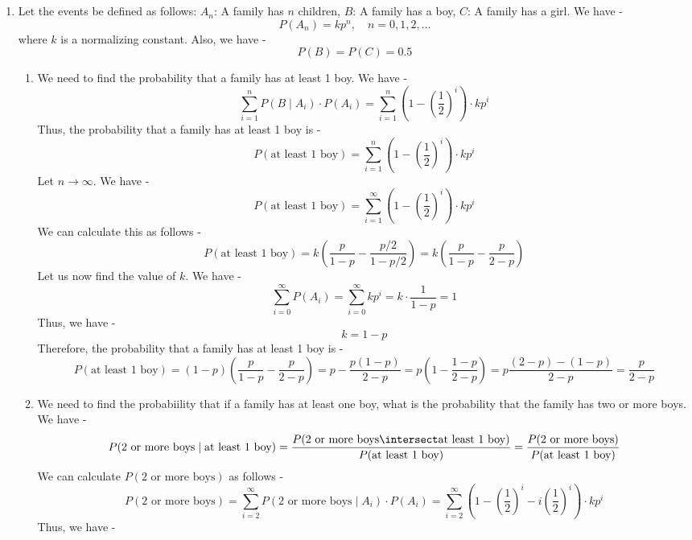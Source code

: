 \chapter{}
\begin{enumerate}
    \item Let the events be defined as follows:
    $A_n$: A family has $n$ children, $B$: A family has a boy, $C$: A family has a girl. We have - 
    $$P(A_n) = kp^n, \quad n = 0, 1, 2, \ldots$$
    where $k$ is a normalizing constant. Also, we have -
    $$P(B) = P(C) = 0.5$$
    \begin{enumerate}
        \item We need to find the probability that a family has at least 1 boy. We have - 
        \[
        \sum_{i=1}^{n} P(B \mid A_i) \cdot P(A_i) = \sum_{i=1}^{n} \left(1 - \left(\frac{1}{2}\right)^i\right) \cdot kp^i
        \]
        Thus, the probability that a family has at least 1 boy is -
        \[\boxed{P(\text{at least 1 boy}) = \sum_{i=1}^{n} \left(1 - \left(\frac{1}{2}\right)^i\right) \cdot kp^i
        }\]
        Let $n \to \infty$. We have -
        \[P(\text{at least 1 boy}) = \sum_{i=1}^{\infty} \left(1 - \left(\frac{1}{2}\right)^i\right) \cdot kp^i\]
        We can calculate this as follows -
        \[\boxed{P(\text{at least 1 boy}) = k \left(\frac{p}{1-p} - \frac{p/2}{1 - p/2}\right) = k \left(\frac{p}{1-p} - \frac{p}{2-p}\right)
        }\]
        Let us now find the value of $k$. We have -
        \[\sum_{i=0}^{\infty} P(A_i) = \sum_{i=0}^{\infty} kp^i = k \cdot \frac{1}{1-p} = 1\]
        Thus, we have -
        \[k = 1 - p\]
        Therefore, the probability that a family has at least 1 boy is -
        \[\boxed{P(\text{at least 1 boy}) = (1 - p) \left(\frac{p}{1-p} - \frac{p}{2-p}\right) = p - \frac{p(1-p)}{2-p} = p(1 - \frac{1-p}{2-p}) = p\frac{(2-p) - (1-p)}{2-p} = \frac{p}{2-p}
        }\]
        \item We need to find the probabiility that if a family has at least one boy, what is the probability that the family has two or more boys. We have -
        \[P(\text{2 or more boys} \mid \text{at least 1 boy}) = \frac{P(\text{2 or more boys} \intersect \text{at least 1 boy})}{P(\text{at least 1 boy})} = \frac{P(\text{2 or more boys})}{P(\text{at least 1 boy})}\]
        We can calculate $P(\text{2 or more boys})$ as follows -
        \[P(\text{2 or more boys}) = \sum_{i=2}^{\infty} P(\text{2 or more boys} \mid A_i) \cdot P(A_i) = \sum_{i=2}^{\infty} \left(1 - \left(\frac{1}{2}\right)^i - i\left(\frac{1}{2}\right)^i\right) \cdot kp^i\]
        Thus, we have -

\end{enumerate}
\end{enumerate}
